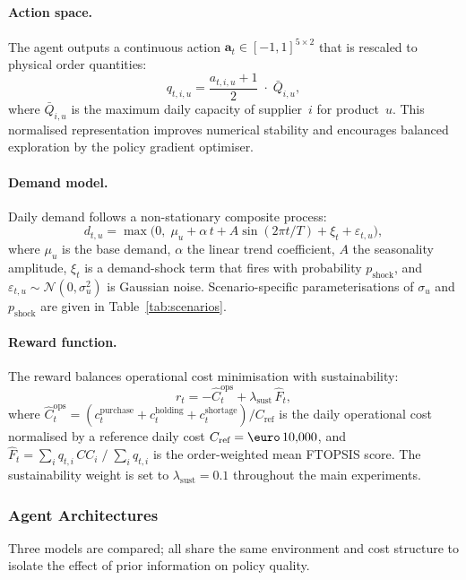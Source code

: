 \documentclass[preprint,12pt]{elsarticle}
\begin{document}
\paragraph{Action space.}
The agent outputs a continuous action $\mathbf{a}_t\in[-1,1]^{5\times 2}$ that is rescaled to physical order quantities:
\begin{equation}
q_{t,i,u} = \frac{a_{t,i,u}+1}{2}\;\cdot\;\bar{Q}_{i,u},
\label{eq:action}
\end{equation}
where $\bar{Q}_{i,u}$ is the maximum daily capacity of supplier~$i$ for product~$u$. This normalised representation improves numerical stability and encourages balanced exploration by the policy gradient optimiser.

\paragraph{Demand model.}
Daily demand follows a non-stationary composite process:
\begin{equation}
d_{t,u} = \max\!\bigl(0,\;\mu_u + \alpha\,t + A\sin(2\pi t/T) + \xi_t + \varepsilon_{t,u}\bigr),
\label{eq:demand}
\end{equation}
where $\mu_u$ is the base demand, $\alpha$ the linear trend coefficient, $A$ the seasonality amplitude, $\xi_t$ is a demand-shock term that fires with probability $p_{\text{shock}}$, and $\varepsilon_{t,u}\sim\mathcal{N}(0,\sigma_u^2)$ is Gaussian noise. Scenario-specific parameterisations of $\sigma_u$ and $p_{\text{shock}}$ are given in Table~\ref{tab:scenarios}.

\paragraph{Reward function.}
The reward balances operational cost minimisation with sustainability:
\begin{equation}
r_t = -\hat{C}_{t}^{\text{ops}} + \lambda_{\text{sust}}\,\hat{F}_t,
\label{eq:reward}
\end{equation}
where $\hat{C}_{t}^{\text{ops}} = (c_t^{\text{purchase}}+c_t^{\text{holding}}+c_t^{\text{shortage}})/C_{\text{ref}}$ is the daily operational cost normalised by a reference daily cost $C_{\text{ref}}=\text{\euro}\,10{,}000$, and $\hat{F}_t = \sum_i q_{t,i}\,CC_i\;/\;\sum_i q_{t,i}$ is the order-weighted mean FTOPSIS score. The sustainability weight is set to $\lambda_{\text{sust}}=0.1$ throughout the main experiments.

\subsubsection{Agent Architectures}
Three models are compared; all share the same environment and cost structure to isolate the effect of prior information on policy quality.
\end{document}
